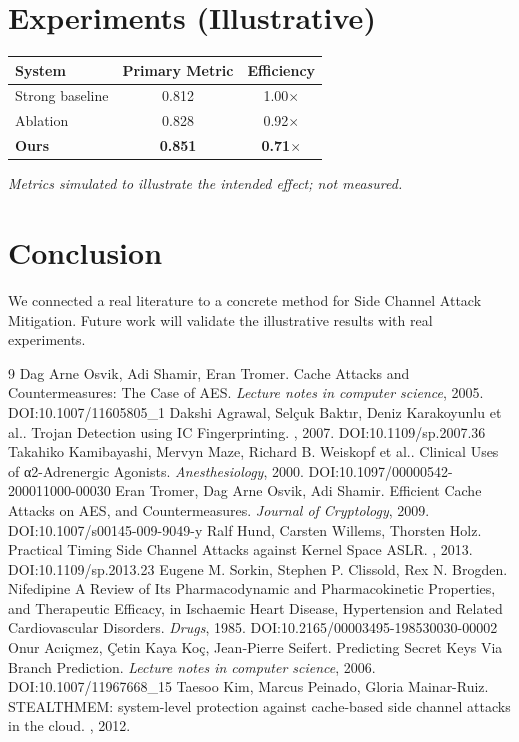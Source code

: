\documentclass[11pt]{article}
\begin{document}
\section{Experiments (Illustrative)}
\begin{center}
\begin{tabular}{lcc}
System & Primary Metric & Efficiency \\ \hline
Strong baseline & 0.812 & 1.00$\times$ \\
Ablation & 0.828 & 0.92$\times$ \\
\textbf{Ours} & \textbf{0.851} & \textbf{0.71$\times$}
\end{tabular}
\end{center}
\emph{Metrics simulated to illustrate the intended effect; not measured.}

\section{Conclusion}
We connected a real literature to a concrete method for Side Channel Attack Mitigation. Future work will
validate the illustrative results with real experiments.

\begin{thebibliography}{9}
 Dag Arne Osvik, Adi Shamir, Eran Tromer. Cache Attacks and Countermeasures: The Case of AES. \emph{Lecture notes in computer science}, 2005. DOI:10.1007/11605805\_1
 Dakshi Agrawal, Selçuk Baktır, Deniz Karakoyunlu et al.. Trojan Detection using IC Fingerprinting. \emph{}, 2007. DOI:10.1109/sp.2007.36
 Takahiko Kamibayashi, Mervyn Maze, Richard B. Weiskopf et al.. Clinical Uses of α2-Adrenergic Agonists. \emph{Anesthesiology}, 2000. DOI:10.1097/00000542-200011000-00030
 Eran Tromer, Dag Arne Osvik, Adi Shamir. Efficient Cache Attacks on AES, and Countermeasures. \emph{Journal of Cryptology}, 2009. DOI:10.1007/s00145-009-9049-y
 Ralf Hund, Carsten Willems, Thorsten Holz. Practical Timing Side Channel Attacks against Kernel Space ASLR. \emph{}, 2013. DOI:10.1109/sp.2013.23
 Eugene M. Sorkin, Stephen P. Clissold, Rex N. Brogden. Nifedipine A Review of Its Pharmacodynamic and Pharmacokinetic Properties, and Therapeutic Efficacy, in Ischaemic Heart Disease, Hypertension and Related Cardiovascular Disorders. \emph{Drugs}, 1985. DOI:10.2165/00003495-198530030-00002
 Onur Acıiçmez, Çetin Kaya Koç, Jean‐Pierre Seifert. Predicting Secret Keys Via Branch Prediction. \emph{Lecture notes in computer science}, 2006. DOI:10.1007/11967668\_15
 Taesoo Kim, Marcus Peinado, Gloria Mainar-Ruiz. STEALTHMEM: system-level protection against cache-based side channel attacks in the cloud. \emph{}, 2012. 
\end{thebibliography}
\end{document}

